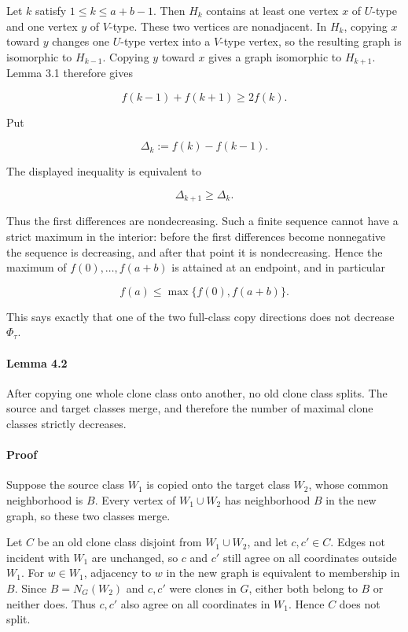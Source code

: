 \documentclass[
  american,
  11pt,
  a4paper,
]{article}
\begin{document}
Let \(k\) satisfy \(1\le k\le a+b-1\). Then \(H_k\) contains at least one vertex \(x\) of \(U\)-type and one vertex \(y\) of \(V\)-type. These two vertices are nonadjacent. In \(H_k\), copying \(x\) toward \(y\) changes one \(U\)-type vertex into a \(V\)-type vertex, so the resulting graph is isomorphic to \(H_{k-1}\). Copying \(y\) toward \(x\) gives a graph isomorphic to \(H_{k+1}\). Lemma 3.1 therefore gives

\[
f(k-1)+f(k+1)\ge2f(k).
\]

Put

\[
\Delta_k:=f(k)-f(k-1).
\]

The displayed inequality is equivalent to

\[
\Delta_{k+1}\ge\Delta_k.
\]

Thus the first differences are nondecreasing. Such a finite sequence cannot have a strict maximum in the interior: before the first differences become nonnegative the sequence is decreasing, and after that point it is nondecreasing. Hence the maximum of \(f(0),\ldots,f(a+b)\) is attained at an endpoint, and in particular

\[
f(a)\le\max\{f(0),f(a+b)\}.
\]

This says exactly that one of the two full-class copy directions does not decrease \(\Phi_\tau\).

\paragraph{Lemma 4.2}\label{lemma-4.2}

After copying one whole clone class onto another, no old clone class splits. The source and target classes merge, and therefore the number of maximal clone classes strictly decreases.

\paragraph{Proof}\label{proof-3}

Suppose the source class \(W_1\) is copied onto the target class \(W_2\), whose common neighborhood is \(B\). Every vertex of \(W_1\cup W_2\) has neighborhood \(B\) in the new graph, so these two classes merge.

Let \(C\) be an old clone class disjoint from \(W_1\cup W_2\), and let \(c,c'\in C\). Edges not incident with \(W_1\) are unchanged, so \(c\) and \(c'\) still agree on all coordinates outside \(W_1\). For \(w\in W_1\), adjacency to \(w\) in the new graph is equivalent to membership in \(B\). Since \(B=N_G(W_2)\) and \(c,c'\) were clones in \(G\), either both belong to \(B\) or neither does. Thus \(c,c'\) also agree on all coordinates in \(W_1\). Hence \(C\) does not split.
\end{document}
